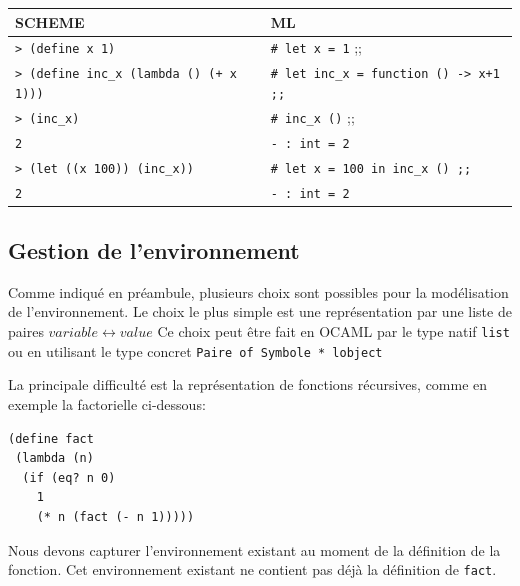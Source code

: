 \documentclass[11pt]{book}
\begin{document}
\begin{tabular}{l|l} \hline
SCHEME & ML \\ \hline 
\verb!> (define x 1)! & \verb+# let x = 1+ ;; \\
\verb!> (define inc_x (lambda () (+ x 1)))! & \verb!# let inc_x = function () -> x+1 ;;! \\
\verb!> (inc_x)! & \verb!# inc_x ()! ;; \\ 
\verb!2! & \verb+- : int = 2+ \\
\verb!> (let ((x 100)) (inc_x))! &  \verb!# let x = 100 in inc_x () ;;! \\
\verb!2! & \verb+- : int = 2+  \\
\end{tabular}


\subsection{Gestion de l'environnement}


Comme indiqu\'{e} en pr\'{e}ambule, plusieurs choix sont possibles pour la mod\'{e}lisation de l'environnement.
Le choix le plus simple est une repr\'{e}sentation par une liste de paires $variable \leftrightarrow  value$
Ce choix peut être fait en OCAML par le type natif \verb+list+ ou en utilisant le type concret \verb+Paire of Symbole * lobject+

La principale difficulté est la représentation de fonctions récursives, comme en exemple la factorielle ci-dessous:
\begin{Verbatim}
(define fact 
 (lambda (n) 
  (if (eq? n 0) 
    1
    (* n (fact (- n 1)))))
\end{Verbatim}
Nous devons capturer l'environnement existant au moment de la définition de la fonction.
Cet environnement existant ne contient pas déjà la définition de \verb+fact+.
\end{document}
